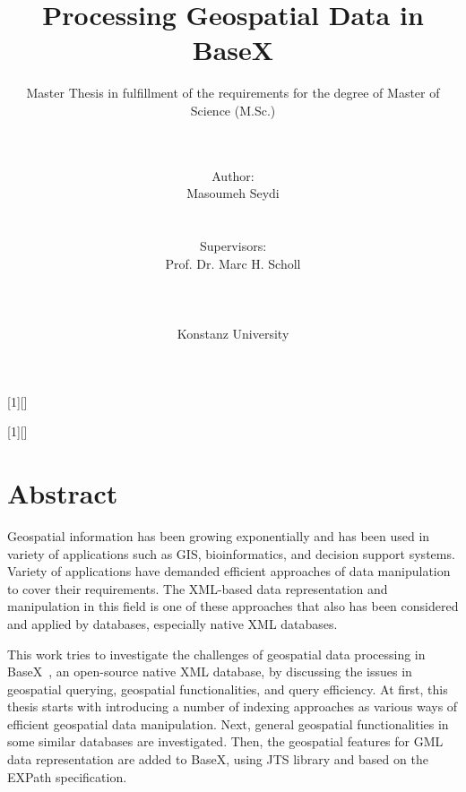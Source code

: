 \documentclass[a4paper,12pt]{article}
\title{Processing Geospatial Data in BaseX}
\subtitle{Master Thesis in fulfillment of the requirements for the degree of
Master of Science (M.Sc.)}
\author{\\\\Author: \\
	Masoumeh Seydi
	\\\\\\Supervisors: \\
	Prof. Dr. Marc H. Scholl \\ 
	\\\\\\
	Konstanz University}
\begin{document}
[1][]{
\lstset{#1}}{}

[1][]{
\lstset{#1}}{}


\renewcommand{\lstlistingname}{Code}


\maketitle
\thispagestyle{empty}

\newpage
\section*{Abstract}
Geospatial information has been growing exponentially and has been used in variety of applications such as GIS, bioinformatics, and decision support systems. 
Variety of applications have demanded efficient approaches of data manipulation to cover their requirements. 
The XML-based data representation and manipulation in this field is one of these approaches that also has been considered and applied by databases, especially native XML databases. 

This work tries to investigate the challenges of geospatial data processing in BaseX~\cite{www/basex}, an open-source native XML database, by discussing the issues in geospatial querying, geospatial functionalities, and query efficiency. 
At first, this thesis starts with introducing a number of indexing approaches as various ways of efficient geospatial data manipulation. 
Next, general geospatial functionalities in some similar databases are investigated. 
Then, the geospatial features for GML~\cite{gml} data representation are added to BaseX, using JTS library and based on the EXPath specification.
\end{document}

